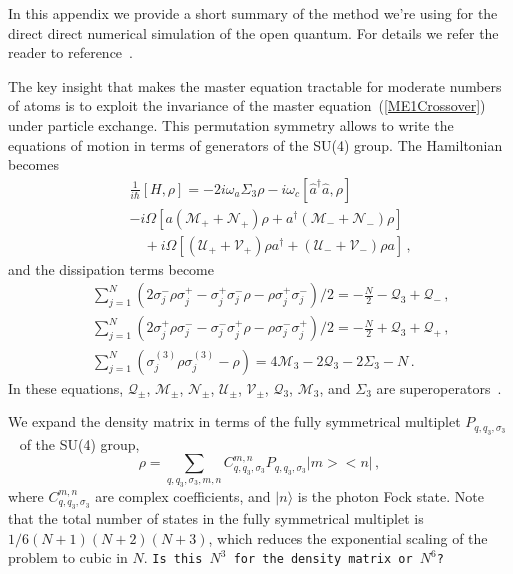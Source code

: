 \documentclass[aps,
twocolumn,
showpacs,
superscriptaddress,groupedaddress]{revtex4}
\newcommand{\dmcomment}[1]{{\tt #1}}
\begin{document}
In this appendix we provide a short summary of the method we're using
for the direct direct numerical simulation of the open quantum.  For
details we refer the reader to reference~\cite{PhysRevA.87.062101}.

The key insight that makes the master equation tractable for moderate
numbers of atoms is to exploit the invariance of the
master equation~(\ref{ME1Crossover}) under particle exchange.  This
permutation symmetry allows to write the equations of motion in terms of
generators of the SU(4) group.  The Hamiltonian becomes
\begin{eqnarray}
  &&\frac{1}{i\hbar}[H,\rho]=
  -2i \omega_a \Sigma_3\rho -i\omega_c [ \hat{a}^{\dagger}\hat{a}, \rho]
  \nonumber
  \\
  &&-i\Omega \left[a(\mathcal{M}_++\mathcal{N}_+)\rho+a^\dagger
    (\mathcal{M}_-+\mathcal{N}_-)\rho\right]\nonumber\\
  &&\quad{}+i\Omega\left[(\mathcal{U}_++\mathcal{V}_+)\rho a^\dagger
    +(\mathcal{U}_-+\mathcal{V}_-)\rho a\right]\,,
\end{eqnarray}
and the dissipation terms become
\begin{eqnarray}\label{liv}
 && \sum_{j=1}^N(
   2\sigma_j^-\rho\sigma_j^+-\sigma_j^+ \sigma_j^-\rho-
   \rho \sigma_j^+\sigma_j^-
  )/2=-\frac{N}{2}-
  \mathcal{Q}_3+\mathcal{Q}_{-}\,,\nonumber\\
 && \sum_{j=1}^N(
   2\sigma_j^+\rho\sigma_j^--\sigma_j^- \sigma_j^+\rho-
   \rho \sigma_j^-\sigma_j^+
  )/2=-\frac{N}{2}+
  \mathcal{Q}_3+\mathcal{Q}_{+}\,,\nonumber\\
 && \sum_{j=1}^N(\sigma_j^{(3)}\rho\sigma_j^{(3)}-\rho)=4\mathcal{M}_3-2
  \mathcal{Q}_3-2\Sigma_3-N\,.
  \label{ham}
\end{eqnarray}
In these equations, $\mathcal{Q}_{\pm}$, $\mathcal{M}_{\pm}$, $\mathcal{N}_{\pm}$,
$\mathcal{U}_{\pm}$, $\mathcal{V}_{\pm}$, $\mathcal{Q}_3$, $\mathcal{M}_3$,
and $\Sigma_3$ are superoperators~\cite{PhysRevA.87.062101}.

We expand the density matrix in terms of the fully symmetrical multiplet
$P_{q,q_3,\sigma_3}$~\cite{PhysRevA.87.062101} of the SU(4) group,
\begin{equation}\label{ex}
  \rho=\sum_{q,q_3,\sigma_3,m,n} C_{q,q_3,\sigma_3}^{m,n}
  P_{q,q_3,\sigma_3}\bigl|m\bigr>\bigl<n\bigr|\,,
\end{equation}
where $C_{q,q_3,\sigma_3}^{m,n}$ are complex coefficients, and
$|n\rangle$ is the photon Fock state. Note that the total number of
states in the fully symmetrical multiplet is $1/6 (N+1)(N+2)(N+3)$,
which reduces the exponential scaling of the problem to cubic in $N$.
\dmcomment{Is this $N^3$ for the density matrix or $N^6$?}
\end{document}

